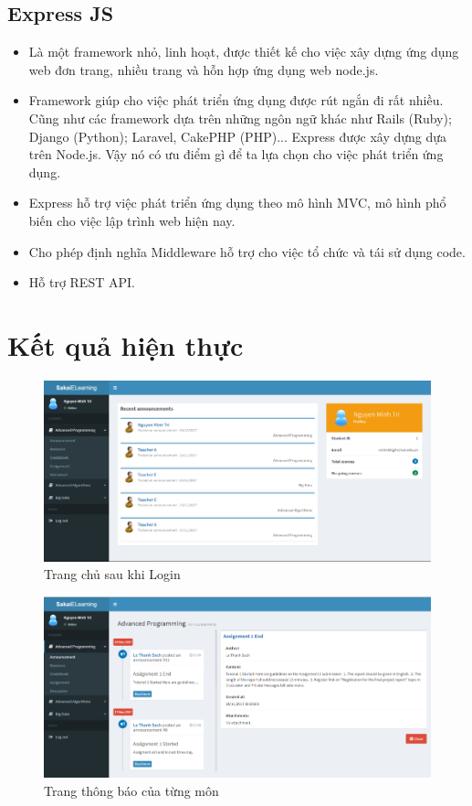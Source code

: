 \documentclass[12pt]{article}
\begin{document}
\subsection{Express JS}
\begin{itemize}
\item Là một framework nhỏ, linh hoạt, được thiết kế cho việc xây dựng ứng dụng web đơn trang, nhiều trang và hỗn hợp ứng dụng web node.js. 
\item Framework giúp cho việc phát triển ứng dụng được rút ngắn đi rất nhiều. Cũng như các framework dựa trên những ngôn ngữ khác như Rails (Ruby); Django (Python); Laravel, CakePHP (PHP)... Express được xây dựng dựa trên Node.js. Vậy nó có ưu điểm gì để ta lựa chọn cho việc phát triển ứng dụng.
\item Express hỗ trợ việc phát triển ứng dụng theo mô hình MVC, mô hình phổ biến cho việc lập trình web hiện nay.
\item Cho phép định nghĩa Middleware hỗ trợ cho việc tổ chức và tái sử dụng code.
\item Hỗ trợ REST API.
\end{itemize}
\newpage

\section{Kết quả hiện thực}

\begin{figure}[H]
\centering
\includegraphics[scale = 1]{sakai1.png}
\caption{Trang chủ sau khi Login}
\end{figure}

\begin{figure}[H]
\centering
\includegraphics[scale = 1]{sakai2.png}
\caption{Trang thông báo của từng môn }
\end{figure}
\end{document}
